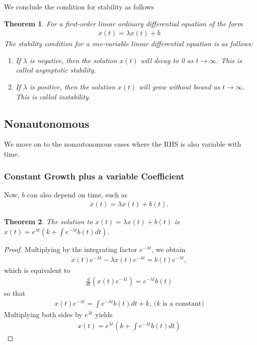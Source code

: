 \documentclass[11pt,a4paper]{book}
\newtheorem{theorem}{Theorem}[section]
\theoremstyle{definition}\newtheorem{definition}{Definition}
\theoremstyle{definition}\newtheorem{fact}{Fact}
\theoremstyle{definition}\newtheorem{remark}{Remark}
\theoremstyle{definition}\newtheorem{ex}{Ex.}
\theoremstyle{definition}\newtheorem{project}{Project}
\theoremstyle{definition}\newtheorem{problem}{Problem}
\theoremstyle{definition}\newtheorem{example}{Example}
\newenvironment{ftheorem}
{\begin{mdframed}\begin{theorem}}
		{\end{theorem}\end{mdframed}}
\numberwithin{theorem}{section}
\numberwithin{corollary}{chapter}
\numberwithin{assumption}{chapter}
\numberwithin{definition}{chapter}
\numberwithin{prop}{chapter}
\numberwithin{notation}{chapter}
\numberwithin{problem}{chapter}
\numberwithin{example}{chapter}
\numberwithin{fact}{chapter}
\numberwithin{ex}{chapter}
\begin{document}
	We conclude the condition for stability as follows
	\begin{ftheorem}
		For a first-order linear ordinary differential equation of the form
		\begin{align*}
			\dot{x}(t) = \lambda x(t) + b
		\end{align*}
		The stability condition for a one-variable linear differential equation is as follows:
		\begin{enumerate}
			\item If $\lambda$ is negative, then the solution $x(t)$ will decay to 0 as $t\to\infty$. This is called asymptotic stability.
			\item If $\lambda$ is positive, then the solution $x(t)$ will grow without bound as $t\to\infty$. This is called instability.
		\end{enumerate}
	\end{ftheorem}
	
	\subsection{Nonautonomous}
	We move on to the nonautonomous cases where the RHS is also variable with time.
	\subsubsection{Constant Growth plus a variable Coefficient}
	Now, $b$ can also depend on time, such as
	\begin{align*}
		\dot{x}(t) = \lambda x(t) + b(t).
	\end{align*}
	\begin{theorem}
		The solution to $\dot{x}(t) = \lambda x(t) + b(t)$ is $x(t) = e^{\lambda t} \left( k + \int e^{-\lambda t} b(t) dt \right)$.
	\end{theorem}
	\begin{proof}
		Multiplying by the integrating factor $e^{-\lambda t}$, we obtain
		\begin{align*}
			\dot{x}(t) e^{-\lambda t} - \lambda x(t) e^{-\lambda t} = b(t) e^{-\lambda t},
		\end{align*}
		which is equivalent to
		\begin{align*}
			\frac{d}{dt} \left( x(t) e^{-\lambda t} \right) =  e^{-\lambda t} b(t)
		\end{align*}
		so that
		\begin{align*}
			x(t) e^{-\lambda t} = \int  e^{-\lambda t} b(t) dt + k, \ \text{($k$ is a constant)}
		\end{align*}
		Multiplying both sides by $e^{\lambda t}$ yields
		\begin{align*}
			x(t) = e^{\lambda t} \left( k + \int e^{-\lambda t} b(t) dt \right)
		\end{align*}
	\end{proof}
	
\end{document}
